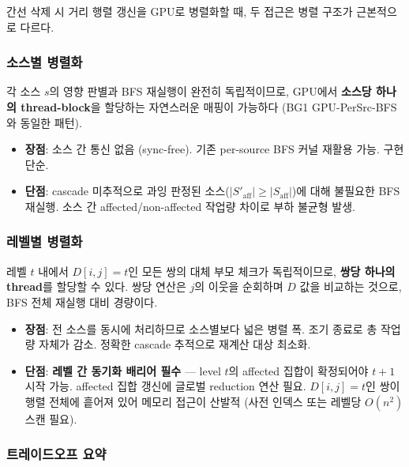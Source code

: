 \documentclass[11pt,a4paper]{article}
\begin{document}
간선 삭제 시 거리 행렬 갱신을 GPU로 병렬화할 때, 두 접근은 병렬 구조가 근본적으로 다르다.

\subsubsection{소스별 병렬화}

각 소스 $s$의 영향 판별과 BFS 재실행이 완전히 독립적이므로, GPU에서 \textbf{소스당 하나의 thread-block}을 할당하는 자연스러운 매핑이 가능하다 (BG1 GPU-PerSrc-BFS와 동일한 패턴).

\begin{itemize}[leftmargin=1.4em]
  \item \textbf{장점}: 소스 간 통신 없음 (sync-free). 기존 per-source BFS 커널 재활용 가능. 구현 단순.
  \item \textbf{단점}: cascade 미추적으로 과잉 판정된 소스($|S'_{\text{aff}}| \geq |S_{\text{aff}}|$)에 대해 불필요한 BFS 재실행. 소스 간 affected/non-affected 작업량 차이로 부하 불균형 발생.
\end{itemize}

\subsubsection{레벨별 병렬화}

레벨 $t$ 내에서 $D[i,j]=t$인 모든 쌍의 대체 부모 체크가 독립적이므로, \textbf{쌍당 하나의 thread}를 할당할 수 있다. 쌍당 연산은 $j$의 이웃을 순회하며 $D$ 값을 비교하는 것으로, BFS 전체 재실행 대비 경량이다.

\begin{itemize}[leftmargin=1.4em]
  \item \textbf{장점}: 전 소스를 동시에 처리하므로 소스별보다 넓은 병렬 폭. 조기 종료로 총 작업량 자체가 감소. 정확한 cascade 추적으로 재계산 대상 최소화.
  \item \textbf{단점}: \textbf{레벨 간 동기화 배리어 필수} --- level $t$의 affected 집합이 확정되어야 $t+1$ 시작 가능. affected 집합 갱신에 글로벌 reduction 연산 필요. $D[i,j]=t$인 쌍이 행렬 전체에 흩어져 있어 메모리 접근이 산발적 (사전 인덱스 또는 레벨당 $O(n^2)$ 스캔 필요).
\end{itemize}

\subsubsection{트레이드오프 요약}
\end{document}
